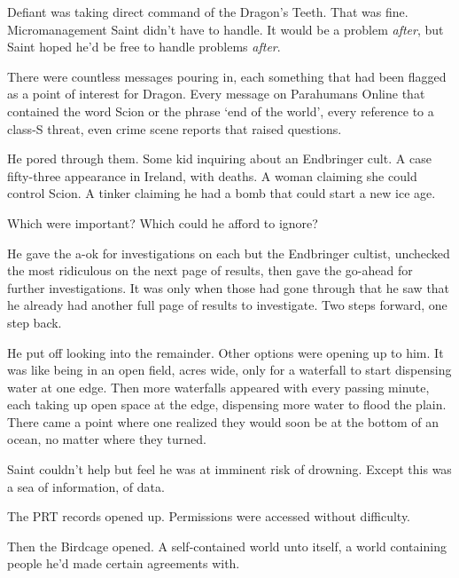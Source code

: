 Defiant was taking direct command of the Dragon's Teeth.  That was fine.  Micromanagement Saint didn't have to handle.  It would be a problem \emph{after}, but Saint hoped he'd be free to handle problems \emph{after}.



There were countless messages pouring in, each something that had been flagged as a point of interest for Dragon.  Every message on Parahumans Online that contained the word Scion or the phrase `end of the world', every reference to a class-S threat, even crime scene reports that raised questions.



He pored through them.  Some kid inquiring about an Endbringer cult.  A case fifty-three appearance in Ireland, with deaths.  A woman claiming she could control Scion.  A tinker claiming he had a bomb that could start a new ice age.



Which were important?  Which could he afford to ignore?



He gave the a-ok for investigations on each but the Endbringer cultist, unchecked the most ridiculous on the next page of results, then gave the go-ahead for further investigations.  It was only when those had gone through that he saw that he already had another full page of results to investigate.  Two steps forward, one step back.



He put off looking into the remainder.  Other options were opening up to him.  It was like being in an open field, acres wide, only for a waterfall to start dispensing water at one edge.  Then more waterfalls appeared with every passing minute, each taking up open space at the edge, dispensing more water to flood the plain.  There came a point where one realized they would soon be at the bottom of an ocean, no matter where they turned.



Saint couldn't help but feel he was at imminent risk of drowning.  Except this was a sea of information, of data.



The PRT records opened up.  Permissions were accessed without difficulty.



Then the Birdcage opened.  A self-contained world unto itself, a world containing people he'd made certain agreements with.



